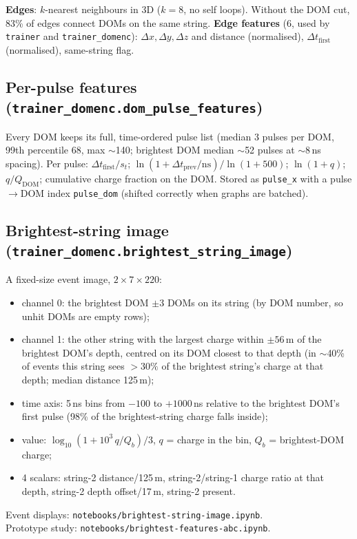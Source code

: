\documentclass[11pt,a4paper]{article}
\newcommand{\code}[1]{\texttt{#1}}
\begin{document}
\medskip
\textbf{Edges}: $k$-nearest neighbours in 3D ($k=8$, no self loops). Without the DOM cut, 83\% of edges connect DOMs on
the same string. \textbf{Edge features} (6, used by \code{trainer} and \code{trainer\_domenc}):
$\Delta x,\Delta y,\Delta z$ and distance (normalised), $\Delta t_\mathrm{first}$ (normalised), same-string flag.

\subsection{Per-pulse features (\code{trainer\_domenc.dom\_pulse\_features})}
Every DOM keeps its full, time-ordered pulse list (median 3 pulses per DOM, 99th percentile 68, max $\sim$140;
brightest DOM median $\sim$52 pulses at $\sim$8\,ns spacing). Per pulse:
$\Delta t_\mathrm{first}/s_t$; $\ln(1+\Delta t_\mathrm{prev}/\mathrm{ns})/\ln(1+500)$; $\ln(1+q)$; $q/Q_\mathrm{DOM}$;
cumulative charge fraction on the DOM. Stored as \code{pulse\_x} with a pulse$\to$DOM index \code{pulse\_dom}
(shifted correctly when graphs are batched).

\subsection{Brightest-string image (\code{trainer\_domenc.brightest\_string\_image})}
A fixed-size event image, $2\times7\times220$:
\begin{itemize}
  \item channel 0: the brightest DOM $\pm3$ DOMs on its string (by DOM number, so unhit DOMs are empty rows);
  \item channel 1: the other string with the largest charge within $\pm56$\,m of the brightest DOM's depth, centred on
        its DOM closest to that depth (in $\sim$40\% of events this string sees $>30\%$ of the brightest string's charge
        at that depth; median distance 125\,m);
  \item time axis: 5\,ns bins from $-100$ to $+1000$\,ns relative to the brightest DOM's first pulse (98\% of the
        brightest-string charge falls inside);
  \item value: $\log_{10}(1+10^3\,q/Q_b)/3$, $q$ = charge in the bin, $Q_b$ = brightest-DOM charge;
  \item 4 scalars: string-2 distance/125\,m, string-2/string-1 charge ratio at that depth, string-2 depth offset/17\,m,
        string-2 present.
\end{itemize}
Event displays: \code{notebooks/brightest-string-image.ipynb}.\\
Prototype study: \code{notebooks/brightest-features-abc.ipynb}.
\end{document}
